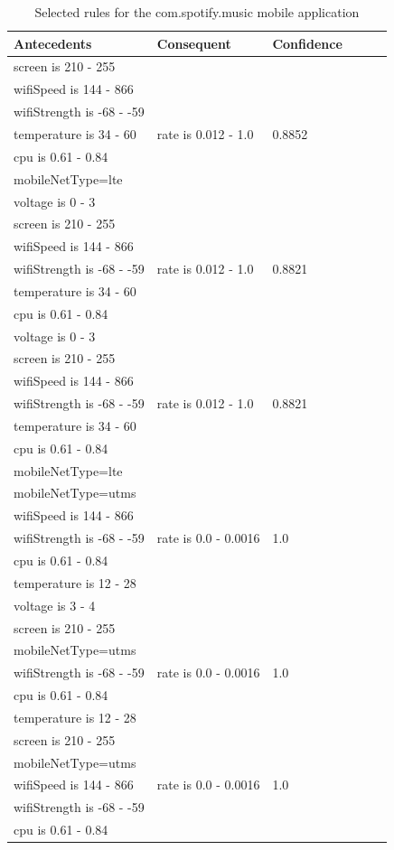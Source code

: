\begin{table} \small%
\begin{tabular}{|p{5.0cm}|p{3.0cm}|p{2.0cm}|p{1.5cm}|p{0.3cm}| p{0.3cm}|}
\hline
Antecedents & Consequent & Confidence \\
\hline
	screen is 210 - 255 		& & \\
	wifiSpeed is 144 - 866		& & \\
	wifiStrength is -68 - -59	& & \\
	temperature is 34 - 60		& rate is 0.012 - 1.0 & 0.8852 \\
	cpu is 0.61 - 0.84			& & \\
	mobileNetType=lte			& & \\
	voltage is 0 - 3			& & \\
\hline
	screen is 210 - 255			& & \\
	wifiSpeed is 144 - 866		& & \\
	wifiStrength is -68 - -59	& rate is 0.012 - 1.0 & 0.8821 \\
	temperature is 34 - 60		& & \\
	cpu is 0.61 - 0.84			& & \\
	voltage is 0 - 3			& & \\
\hline
	screen is 210 - 255			& & \\
	wifiSpeed is 144 - 866		& & \\
	wifiStrength is -68 - -59	& rate is 0.012 - 1.0 & 0.8821 \\
	temperature is 34 - 60		& & \\
	cpu is 0.61 - 0.84			& & \\
	mobileNetType=lte			& & \\
\hline
	mobileNetType=utms			& & \\
	wifiSpeed is 144 - 866		& & \\
	wifiStrength is -68 - -59	& rate is 0.0 - 0.0016 & 1.0 \\
	cpu is 0.61 - 0.84			& & \\
	temperature is 12 - 28		& & \\
	voltage is 3 - 4			& & \\
\hline
	screen is 210 - 255			& & \\
	mobileNetType=utms			& & \\
	wifiStrength is -68 - -59	& rate is 0.0 - 0.0016 & 1.0 \\
	cpu is 0.61 - 0.84			& & \\
	temperature is 12 - 28		& & \\
\hline
	screen is 210 - 255			& & \\
	mobileNetType=utms			& & \\
	wifiSpeed is 144 - 866		& rate is 0.0 - 0.0016 & 1.0 \\
	wifiStrength is -68 - -59	& & \\
	cpu is 0.61 - 0.84			& & \\
\hline
\end{tabular}
	\caption{Selected rules for the com.spotify.music mobile application}
	\label{table:rules-spotify}
\end{table}

